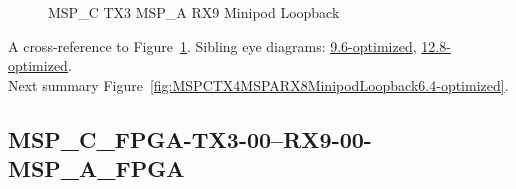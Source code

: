\begin{figure}[h]
\begin{subfigure}{0.33\textwidth}
\hyperref[sec:MSPCFPGATX306RX906MSPAFPGA6.4-optimized]{}
\end{subfigure}\hspace*{\fill}
\begin{subfigure}{0.33\textwidth}
\hyperref[sec:MSPCFPGATX307RX907MSPAFPGA6.4-optimized]{}
\end{subfigure}\hspace*{\fill}
\begin{subfigure}{0.33\textwidth}
\hyperref[sec:MSPCFPGATX308RX908MSPAFPGA6.4-optimized]{}
\end{subfigure}

\begin{subfigure}{0.33\textwidth}
\hyperref[sec:MSPCFPGATX309RX909MSPAFPGA6.4-optimized]{}
\end{subfigure}\hspace*{\fill}
\begin{subfigure}{0.33\textwidth}
\hyperref[sec:MSPCFPGATX310RX910MSPAFPGA6.4-optimized]{}
\end{subfigure}\hspace*{\fill}
\begin{subfigure}{0.33\textwidth}
\hyperref[sec:MSPCFPGATX311RX911MSPAFPGA6.4-optimized]{}
\end{subfigure}

\caption{MSP\_C TX3 MSP\_A RX9 Minipod Loopback} \label{fig:MSPCTX3MSPARX9MinipodLoopback6.4-optimized}
\end{figure}

A cross-reference to Figure~\ref{fig:MSPCTX3MSPARX9MinipodLoopback6.4-optimized}.
Sibling eye diagrams: \hyperref[sec:MSPCTX3MSPARX9MinipodLoopback9.6-optimized]{9.6-optimized}, \hyperref[sec:MSPCTX3MSPARX9MinipodLoopback12.8-optimized]{12.8-optimized}. \\
Next summary Figure~\ref{fig:MSPCTX4MSPARX8MinipodLoopback6.4-optimized}.
\clearpage
% 
\subsection{MSP\_C\_FPGA-TX3-00--RX9-00-MSP\_A\_FPGA}\label{sec:MSPCFPGATX300RX900MSPAFPGA6.4-optimized}

